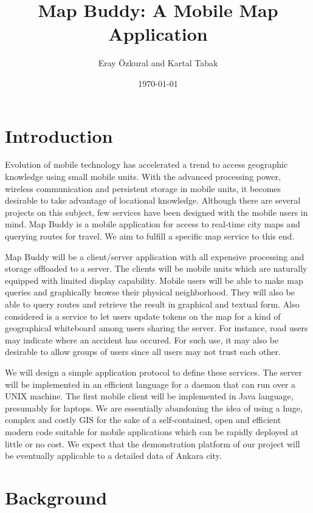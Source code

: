 \documentclass[a4paper,10pt]{article}
\title{ Map Buddy: A Mobile Map Application}
\author{Eray \"Ozkural and Kartal Tabak}
\date{\today}
\begin{document}
\maketitle

\section{Introduction}

Evolution of mobile technology has accelerated a trend to access geographic
knowledge using small mobile units. With the advanced processing power,
wireless communication and persistent storage in mobile units, it becomes
desirable to take advantage of locational knowledge. Although there are
several projects on this subject, few services have been designed with the
mobile users in mind. Map Buddy is a mobile application for access to
real-time city maps and querying routes for travel. We aim to fulfill a
specific map service to this end.

Map Buddy will be a client/server application with all expensive processing
and storage offloaded to a server. The clients will be mobile units which
are naturally equipped with limited display capability. Mobile users will be
able to make map queries and graphically browse their physical neighborhood.
They will also be able to query routes and retrieve the result in graphical
and textual form. Also considered is a service to let users update tokens on
the map for a kind of geographical whiteboard among users sharing the
server. For instance, road users may indicate where an accident has occured.
For such use, it may also be desirable to allow groups of users since all
users may not trust each other.

We will design a simple application protocol to define these services. The
server will be implemented in an efficient language for a daemon that can
run over a UNIX machine. The first mobile client will be implemented in Java
language, presumably for laptops. We are essentially abandoning the idea of
using a huge, complex and costly GIS for the sake of a self-contained, open
and efficient modern code suitable for mobile applications which can be
rapidly deployed at little or no cost. We expect that the demonstration
platform of our project will be eventually applicable to a detailed data of
Ankara city.

\section{Background}
\end{document}
